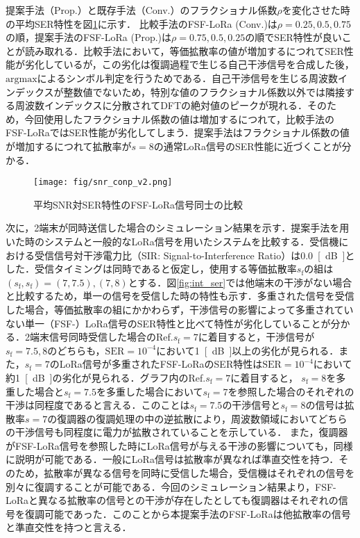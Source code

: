 \documentclass[technicalreport]{ieicej}
\begin{document}
提案手法（Prop.）と既存手法（Conv.）のフラクショナル係数$\rho$を変化させた時の平均SER特性を図\ref{fig:SNR-SER}に示す．
比較手法のFSF-LoRa (Conv.)は$\rho=0.25,0.5,0.75$の順，提案手法のFSF-LoRa (Prop.)は$\rho=0.75,0.5,0.25$の順でSER特性が良いことが読み取れる．比較手法において，等価拡散率の値が増加するにつれてSER性能が劣化しているが，この劣化は復調過程で生じる自己干渉信号を合成した後，$\mathrm{argmax}$によるシンボル判定を行うためである．自己干渉信号を生じる周波数インデックスが整数値でないため，特別な値のフラクショナル係数以外では隣接する周波数インデックスに分散されてDFTの絶対値のピークが現れる．そのため，今回使用したフラクショナル係数の値は増加するにつれて，比較手法のFSF-LoRaではSER性能が劣化してしまう．提案手法はフラクショナル係数の値が増加するにつれて拡散率が$s=8$の通常LoRa信号のSER性能に近づくことが分かる．



\begin{figure}[t] 
\centering
\texttt{[image: fig/snr\_conp\_v2.png]}
\caption{平均SNR対SER特性のFSF-LoRa信号同士の比較}
\label{fig:SNR-SER}
\end{figure}

次に，2端末が同時送信した場合のシミュレーション結果を示す．提案手法を用いた時のシステムと一般的なLoRa信号を用いたシステムを比較する．受信機における受信信号対干渉電力比（SIR: Signal-to-Interference Ratio）は\SI{0.0}{[dB]}とした．受信タイミングは同時であると仮定し，使用する等価拡散率$s_\mathrm{f}$の組は$(s_\mathrm{f},s_\mathrm{f})=(7,7.5),(7,8)$とする．図\ref{fig:int_ser}では他端末の干渉がない場合と比較するため，単一の信号を受信した時の特性も示す．多重された信号を受信した場合，等価拡散率の組にかかわらず，干渉信号の影響によって多重されていない単一（FSF-）LoRa信号のSER特性と比べて特性が劣化していることが分かる．2端末信号同時受信した場合のRef.$s_\mathrm{f}=7$に着目すると，干渉信号が$s_\mathrm{f}=7.5,8$のどちらも，$\mathrm{SER}=10^{-4}$において\SI{1}{[dB]}以上の劣化が見られる．また，$s_\mathrm{f}=7$のLoRa信号が多重されたFSF-LoRaのSER特性は$\mathrm{SER}=10^{-4}$において約\SI{1}{[dB]}の劣化が見られる．グラフ内のRef.$s_\mathrm{f}=7$に着目すると， $s_\mathrm{f}=8$を多重した場合と$s_\mathrm{f}=7.5$を多重した場合において$s_\mathrm{f}=7$を参照した場合のそれぞれの干渉は同程度であると言える．このことは$s_\mathrm{f}=7.5$の干渉信号と$s_\mathrm{f}=8$の信号は拡散率$s=7$の復調器の復調処理の中の逆拡散により，周波数領域においてどちらの干渉信号も同程度に電力が拡散されていることを示している．
また，復調器がFSF-LoRa信号を参照した時にLoRa信号が与える干渉の影響についても，同様に説明が可能である．一般にLoRa信号は拡散率が異なれば準直交性を持つ．そのため，拡散率が異なる信号を同時に受信した場合，受信機はそれぞれの信号を別々に復調することが可能である．今回のシミュレーション結果より，FSF-LoRaと異なる拡散率の信号との干渉が存在したとしても復調器はそれぞれの信号を復調可能であった．このことから本提案手法のFSF-LoRaは他拡散率の信号と準直交性を持つと言える．
\end{document}
